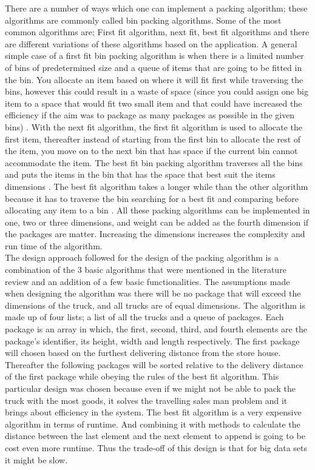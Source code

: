 \documentclass[paper=a4, fontsize=11pt]{scrartcl} %
\numberwithin{equation}{section} %
\numberwithin{figure}{section} %
\numberwithin{table}{section} %
\begin{document}
There are a number of ways which one can implement a packing algorithm; these algorithms are commonly called bin packing algorithms. Some of the most common algorithms are; First fit algorithm, next fit, best fit algorithms and there are different variations of these algorithms based on the application. A general simple case of a first fit bin packing algorithm is when there is a limited number of bins of predetermined size and a queue of items that are going to be fitted in the bin. You allocate an item based on where it will fit first while traversing the bins, however this could result in a waste of space (since you could assign one big item to a space that would fit two small item and that could have increased the efficiency if the aim was to package as many packages as possible in the given bins) \cite{Hong}. With the next fit algorithm, the first fit algorithm is used to allocate the first item, thereafter instead of starting from the first bin to allocate the rest of the item, you move on to the next bin that has space if the current bin cannot accommodate the item. The best fit bin packing algorithm traverses all the bins and puts the items in the bin that has the space that best suit the items dimensions \cite{Zhu}. The best fit algorithm takes a longer while than the other algorithm because it has to traverse the bin searching for a best fit and comparing before allocating any item to a bin \cite{Huang}. All these packing algorithms can be implemented in one, two or three dimensions, and weight can be added as the fourth dimension if the packages are matter.  Increasing the dimensions increases the complexity and run time of the algorithm. \\

The design approach followed for the design of the packing algorithm is a combination of the 3 basic algorithms that were mentioned in the literature review and an addition of a few basic functionalities. The assumptions made when designing the algorithm was there will be no package that will exceed the dimensions of the truck, and all trucks are of equal dimensions. The algorithm is made up of four lists; a list of all the trucks and a queue of packages. Each package is an array in which, the first, second, third, and fourth elements are the package’s identifier, its height, width and length respectively. The first   package will chosen based on the furthest delivering distance from the store house. Thereafter the following packages will be sorted relative to the delivery distance of the first package while obeying the rules of the best fit algorithm. This particular design was chosen because even if we might not be able to pack the truck with the most goods, it solves the travelling sales man problem and it brings about efficiency in the system. The best fit algorithm is a very expensive algorithm in terms of runtime. And combining it with methods to calculate the distance between the last element and the next element to append is going to be cost even more runtime. Thus the trade-off of this design is that for big data sets it might be slow.
\end{document}
